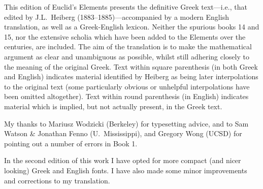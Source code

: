 This  edition of Euclid's Elements presents the definitive Greek text---{\rm i.e.}, that edited by J.L.~Heiberg 
(1883--1885)---accompanied by a modern English translation, as well as a Greek-English
lexicon. Neither the spurious
books 14 and 15, nor the extensive scholia which have been added to
the Elements over the centuries, are included.
The aim of the translation is to make the mathematical argument as clear and unambiguous as possible, whilst still adhering closely to  the meaning of the original Greek. Text within square parenthesis (in both Greek and English) indicates material identified by Heiberg as being later interpolations to the original text (some particularly obvious or unhelpful interpolations have been omitted  
altogether). Text within round parenthesis (in English) indicates material which is implied, but not actually present, in the Greek text. 

My thanks to Mariusz Wodzicki (Berkeley) for typesetting advice, and
to Sam Watson \& Jonathan Fenno (U.\ Mississippi), and  Gregory Wong (UCSD) for pointing out a number of errors in Book 1.

In the second edition of this work I have opted for more compact (and nicer looking) Greek and English fonts. I have also
made some minor improvements and corrections to my translation. 
